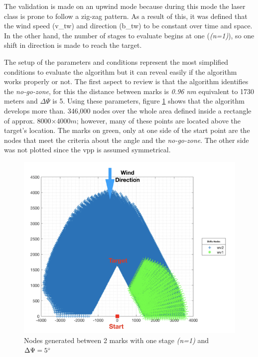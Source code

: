 The validation is made on an upwind mode because during this mode the laser class is prone to follow a zig-zag pattern. As a result of this, it was defined that the wind speed (\acrshort{v_tw}) and direction (\acrshort{b_tw}) to be constant over time and space. In the other hand, the number of stages to evaluate begins at one (\textit{(n=1)}), so one shift in direction is made to reach the target.%
\par 
The setup of the parameters and conditions represent the most simplified conditions to evaluate the algorithm but it can reveal easily if the algorithm works properly or not. The first aspect to review is that the algorithm identifies the \textit{no-go-zone}, for this the distance between marks is \textit{0.96 nm} equivalent to 1730 meters and $\Delta \Psi$ is 5\degree. Using these parameters, figure \ref{fig:Onestages_NoGoZone} shows that the algorithm develops more than. 346,000 nodes over the whole area defined inside a rectangle of approx. 8000$\times 4000 m$; however, many of these points are located above the target's location. The marks on green, only at one side of the start point are the nodes that meet the criteria about the angle and the \textit{no-go-zone}. The other side was not plotted %
since the \acrshort{vpp} is assumed symmetrical.\par 

\begin{figure} [hbt!]
    \centering
    \includegraphics[width=0.45 \linewidth]{images/Nodes_2wv_5deg_5s.png}
    \caption{Nodes generated between 2 marks with one stage \textit{(n=1)} and  $\Delta \Psi = 5 \degree$}
    \label{fig:Onestages_NoGoZone}
\end{figure}

